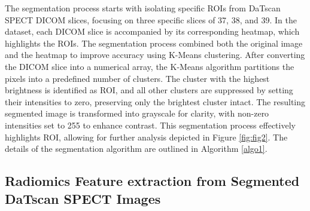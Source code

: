 \documentclass{article}
\begin{document}
The segmentation process starts with isolating specific ROIs from DaTscan SPECT DICOM slices, focusing on three specific slices of 37, 38, and 39. In the dataset, each DICOM slice is accompanied by its corresponding heatmap, which highlights the ROIs. The segmentation process combined both the original image and the heatmap to improve accuracy using K-Means clustering. After converting the DICOM slice into a numerical array, the K-Means algorithm partitions the pixels into a predefined number of clusters. The cluster with the highest brightness is identified as ROI, and all other clusters are suppressed by setting their intensities to zero, preserving only the brightest cluster intact. The resulting segmented image is transformed into grayscale for clarity, with non-zero intensities set to 255 to enhance contrast. This segmentation process effectively highlights ROI, allowing for further analysis depicted in Figure \ref{fig:fig2}. The details of the segmentation algorithm are outlined in Algorithm \ref{algo1}.







\subsection{Radiomics Feature extraction from Segmented DaTscan SPECT Images}
\end{document}
